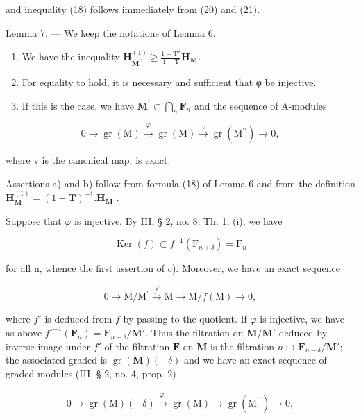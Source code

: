 and inequality (18) follows immediately from (20) and (21).

Lemma 7. — We keep the notations of Lemma 6.

\begin{enumerate}
\def\labelenumi{\alph{enumi})}
\item
  We have the inequality \(\mathbf{H}_{\mathbf{M}^{\prime \prime}}^{(1)}\geqslant \frac{1 - \mathrm{T}^{\delta}}{1 - \mathrm{T}}\mathbf{H}_{\mathbf{M}}.\)
\item
  For equality to hold, it is necessary and sufficient that φ be injective.
\item
  If this is the case, we have \(\mathbf{M}^{\prime}\subset \bigcap_{n}\mathbf{F}_{n}\) and the sequence of A-modules
\end{enumerate}

\[
0 \longrightarrow \operatorname{gr} (\mathrm{M}) \stackrel {\varphi} {\longrightarrow} \operatorname{gr} (\mathrm{M}) \stackrel {v} {\longrightarrow} \operatorname{gr} (\mathrm{M} ^ {\prime \prime}) \longrightarrow 0,
\]

where v is the canonical map, is exact.

Assertions a) and b) follow from formula (18) of Lemma 6 and from the definition \(\mathbf{H}_{\mathbf{M}}^{(1)} = (1 - \mathbf{T})^{-1}.\mathbf{H}_{\mathbf{M}}\) .

Suppose that \(\varphi\) is injective. By III, § 2, no. 8, Th. 1, (i), we have

\[
\operatorname{Ker} (f) \subset f ^ {- 1} (\mathrm{F} _ {n + \delta}) = \mathrm{F} _ {n}
\]

for all n, whence the first assertion of c). Moreover, we have an exact sequence

\[
0 \longrightarrow \mathrm{M} / \mathrm{M} ^ {\prime} \stackrel {f ^ {\prime}} {\longrightarrow} \mathrm{M} \longrightarrow \mathrm{M} / f (\mathrm{M}) \longrightarrow 0,
\]

where \(f'\) is deduced from \(f\) by passing to the quotient. If \(\varphi\) is injective, we have as above \(f'^{-1}(\mathbf{F}_n) = \mathbf{F}_{n-\delta}/\mathbf{M}'\). Thus the filtration on \(\mathbf{M}/\mathbf{M}'\) deduced by inverse image under \(f'\) of the filtration \(\mathbf{F}\) on \(\mathbf{M}\) is the filtration \(n \mapsto \mathbf{F}_{n-\delta}/\mathbf{M}'\); the associated graded is \(\operatorname{gr}(\mathbf{M})(-\delta)\) and we have an exact sequence of graded modules (III, § 2, no. 4, prop. 2)

\[
0 \longrightarrow \operatorname{gr} (\mathrm{M}) (- \delta) \xrightarrow {\varphi^ {\prime}} \operatorname{gr} (\mathrm{M}) \longrightarrow \operatorname{gr} \left(\mathrm{M} ^ {\prime \prime}\right) \longrightarrow 0,
\]

